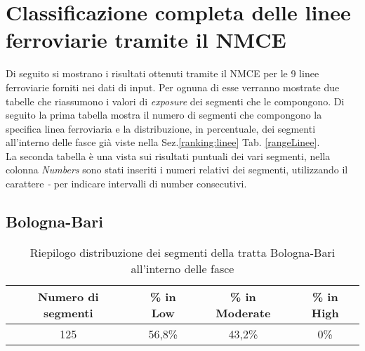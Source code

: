 \newpage

\section{Classificazione completa delle linee ferroviarie tramite il NMCE}
Di seguito si mostrano i risultati ottenuti tramite il NMCE per le 9 linee ferroviarie forniti nei dati di input. Per ognuna di esse verranno mostrate due tabelle che riassumono i valori di \textit{exposure} dei segmenti  che le compongono.
Di seguito la prima tabella mostra il numero di segmenti che compongono la specifica linea ferroviaria e la distribuzione, in percentuale, dei segmenti all'interno delle fasce già viste  nella Sez.\ref{ranking:linee}  Tab. \ref{rangeLinee}.\\
La seconda tabella è una vista sui risultati puntuali dei vari segmenti, nella colonna \textit{Numbers} sono stati inseriti i numeri relativi dei segmenti, utilizzando il carattere \textit{-} per indicare intervalli di number consecutivi. 

\subsection{Bologna-Bari}
\label{app:bolognabari}

\centering
\begin{table} [bh]
	\caption{Riepilogo distribuzione dei segmenti della tratta Bologna-Bari all'interno delle fasce}
	\centering
	\begin{tabular}  {|c|c|c|c|} 
	
	\hline 
	Numero di segmenti & \% in Low & \% in Moderate & \% in High \\ 
	\hline 
	125 & 56,8\% & 43,2\% & 0\% \\ 
	\hline 
\end{tabular} 
\end{table}


